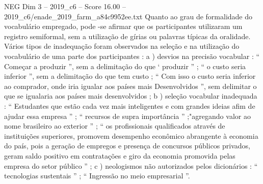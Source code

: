 \begin{textsample}{NEG Dim 3 – 2019\_c6 – Score 16.00 – 2019\_c6/enade\_2019\_farm\_a84c9952ee.txt}
Quanto ao grau de formalidade do vocabulário empregado, pode -se afirmar que os participantes utilizaram um registro semiformal, sem a utilização de gírias ou palavras típicas da oralidade.
Vários tipos de inadequação foram observados na seleção e na utilização do vocabulário de uma parte dos participantes : a ) desvios na precisão vocabular : “ Começar a produzir ”, sem a delimitação do que ‘ produzir ” ; “ o custo seria inferior ”, sem a delimitação do que tem custo ; “ Com isso o custo seria inferior ao comprador, onde iria igualar aos países mais Desenvolvidos ”, sem delimitar o que se igualaria aos países mais desenvolvidos ; b ) seleção vocabular inadequada : “ Estudantes que estão cada vez mais inteligentes e com grandes ideias afim de ajudar essa empresa ” ; “ recursos de supra importância ” ;"agregando valor ao nome brasileiro ao exterior ” ; “ os profissionais qualificados através de instituições superiores, promovem desempenho econômico abrangente à economia do país, pois a geração de empregos e presença de concursos públicos privados, geram saldo positivo em contratações e giro da economia promovida pelas empresa do setor público ” ; c ) neologismos não autorizados pelos dicionários : “ tecnologias sustentais ” ; “ Ingressão no meio empresarial ”.

\end{textsample}
